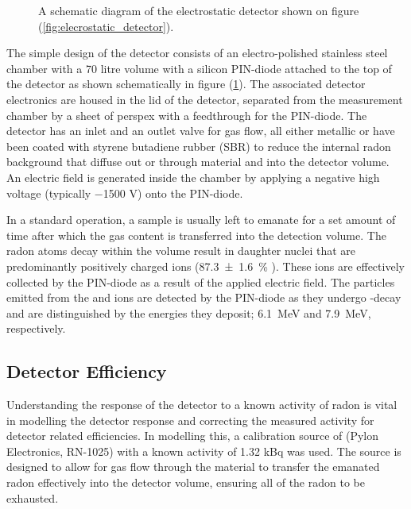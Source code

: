 \begin{figure}[h!]
    \caption[A schematic diagram of the electrostatic detector shown on figure (\ref{fig:elecrostatic_detector}).]
    {A schematic diagram of the electrostatic detector shown on figure (\ref{fig:elecrostatic_detector}).}
    \label{fig:elecrostatic_detector_schematic}
\end{figure}
%

The simple design of the detector consists of an electro-polished stainless steel chamber with a 70 litre volume with a silicon PIN-diode attached to the top of the detector as shown schematically in figure (\ref{fig:elecrostatic_detector_schematic}). The associated detector electronics are housed in the lid of the detector, separated from the measurement chamber by a sheet of perspex with a feedthrough for the PIN-diode. The detector has an inlet and an outlet valve for gas flow, all either metallic or have been coated with styrene butadiene rubber (SBR) to reduce the internal radon background that diffuse out or through material and into the detector volume. An electric field is generated inside the chamber by applying a negative high voltage (typically −1500 V) onto the PIN-diode.
 
In a standard operation, a sample is usually left to emanate for a set amount of time after which the gas content is transferred into the detection volume. The radon atoms decay within the volume result in daughter nuclei that are predominantly positively charged ions (\SI{87.3\pm1.6}{\percent} \cite{PAGELKOPF20031057}). These ions are effectively collected by the PIN-diode as a result of the applied electric field. The \alpha{} particles emitted from the \potoe{} and \potof{} ions are detected by the PIN-diode as they undergo \alpha{}-decay and are distinguished by the energies they deposit; \SI{6.1}{\mega\electronvolt} and \SI{7.9}{\mega\electronvolt}, respectively. 


\subsection{Detector Efficiency}
\label{sec:detector_efficiency}

Understanding the response of the detector to a known activity of radon is vital in modelling the detector response and correcting the measured activity for detector related efficiencies. In modelling this, a calibration source of \RaTTS{} (Pylon Electronics, RN-1025) with a known activity of 1.32 kBq was used. The source is designed to allow for gas flow through the material to transfer the emanated radon effectively into the detector volume, ensuring all of the radon to be exhausted.

